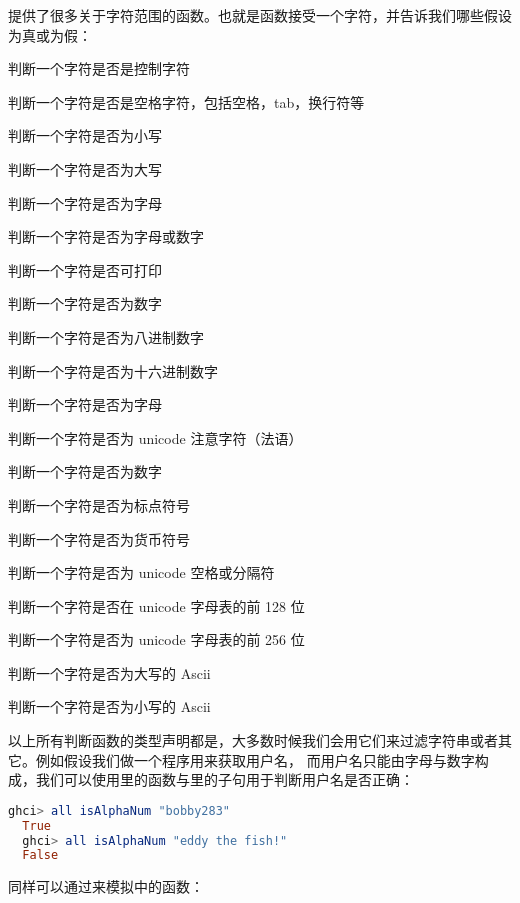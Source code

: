 \documentclass[./main.tex]{subfiles}
\begin{document}
提供了很多关于字符范围的函数。也就是函数接受一个字符，并告诉我们哪些假设为真或为假：

判断一个字符是否是控制字符

判断一个字符是否是空格字符，包括空格，tab，换行符等

判断一个字符是否为小写

判断一个字符是否为大写

判断一个字符是否为字母

判断一个字符是否为字母或数字

判断一个字符是否可打印

判断一个字符是否为数字

判断一个字符是否为八进制数字

判断一个字符是否为十六进制数字

判断一个字符是否为字母

判断一个字符是否为 unicode 注意字符（法语）

判断一个字符是否为数字

判断一个字符是否为标点符号

判断一个字符是否为货币符号

判断一个字符是否为 unicode 空格或分隔符

判断一个字符是否在 unicode 字母表的前 128 位

判断一个字符是否为 unicode 字母表的前 256 位

判断一个字符是否为大写的 Ascii

判断一个字符是否为小写的 Ascii

以上所有判断函数的类型声明都是，大多数时候我们会用它们来过滤字符串或者其它。例如假设我们做一个程序用来获取用户名，
而用户名只能由字母与数字构成，我们可以使用里的函数与里的子句用于判断用户名是否正确：

\begin{lstlisting}[language=Haskell]
  ghci> all isAlphaNum "bobby283"
  True
  ghci> all isAlphaNum "eddy the fish!"
  False
\end{lstlisting}

同样可以通过来模拟中的函数：
\end{document}

